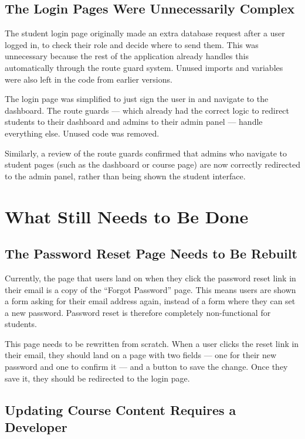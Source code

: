 \documentclass[12pt, a4paper]{article}
\begin{document}
\subsection{The Login Pages Were Unnecessarily Complex}

The student login page originally made an extra database request after a user logged in, to check their role and decide where to send them. This was unnecessary because the rest of the application already handles this automatically through the route guard system. Unused imports and variables were also left in the code from earlier versions.

The login page was simplified to just sign the user in and navigate to the dashboard. The route guards --- which already had the correct logic to redirect students to their dashboard and admins to their admin panel --- handle everything else. Unused code was removed.

Similarly, a review of the route guards confirmed that admins who navigate to student pages (such as the dashboard or course page) are now correctly redirected to the admin panel, rather than being shown the student interface.

\section{What Still Needs to Be Done}

\subsection{The Password Reset Page Needs to Be Rebuilt}

Currently, the page that users land on when they click the password reset link in their email is a copy of the ``Forgot Password'' page. This means users are shown a form asking for their email address again, instead of a form where they can set a new password. Password reset is therefore completely non-functional for students.

This page needs to be rewritten from scratch. When a user clicks the reset link in their email, they should land on a page with two fields --- one for their new password and one to confirm it --- and a button to save the change. Once they save it, they should be redirected to the login page.

\subsection{Updating Course Content Requires a Developer}
\end{document}
